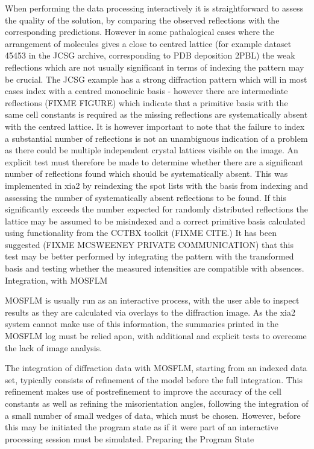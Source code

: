 When performing the data processing interactively it is straightforward to assess the quality of the solution, by comparing the observed reflections with the corresponding predictions. However in some pathalogical cases where the arrangement of molecules gives a close to centred lattice (for example dataset 45453 in the JCSG archive, corresponding to PDB deposition 2PBL) the weak reflections which are not usually significant in terms of indexing the pattern may be crucial. The JCSG example has a strong diffraction pattern which will in most cases index with a centred monoclinic basis - however there are intermediate reflections (FIXME FIGURE) which indicate that a primitive basis with the same cell constants is required as the missing reflections are systematically absent with the centred lattice. It is however important to note that the failure to index a substantial number of reflections is not an unambiguous indication of a problem as there could be multiple independent crystal lattices visible on the image. An explicit test must therefore be made to determine whether there are a significant number of reflections found which should be systematically absent. This was implemented in xia2 by reindexing the spot lists with the basis from indexing and assessing the number of systematically absent reflections to be found. If this significantly exceeds the number expected for randomly distributed reflections the lattice may be assumed to be misindexed and a correct primitive basis calculated using functionality from the CCTBX toolkit (FIXME CITE.) It has been suggested (FIXME MCSWEENEY PRIVATE COMMUNICATION) that this test may be better performed by integrating the pattern with the transformed basis and testing whether the measured intensities are compatible with absences.
Integration, with MOSFLM

MOSFLM is usually run as an interactive process, with the user able to inspect results as they are calculated via overlays to the diffraction image. As the xia2 system cannot make use of this information, the summaries printed in the MOSFLM log must be relied apon, with additional and explicit tests to overcome the lack of image analysis.

The integration of diffraction data with MOSFLM, starting from an indexed data set, typically consists of refinement of the model before the full integration. This refinement makes use of postrefinement to improve the accuracy of the cell constants as well as refining the misorientation angles, following the integration of a small number of small wedges of data, which must be chosen. However, before this may be initiated the program state as if it were part of an interactive processing session must be simulated.
Preparing the Program State

